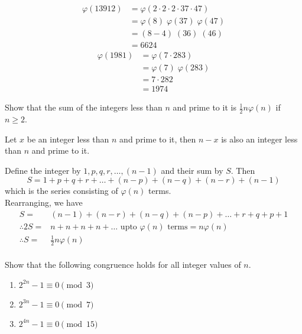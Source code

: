 \documentclass[12pt]{book}
\begin{document}
\begin{soln}
\begin{align*}
        \varphi(13912) & =\varphi(2\cdot 2\cdot2\cdot37\cdot47)                       \\
                       & =\varphi\left( 8\right)\;\varphi\left(37\right)\;\varphi(47) \\
                       & =\left( 8-4\right)\;\left(36\right)\;(46)                    \\
                       & =6624
    \end{align*}
    \begin{align*}
        \varphi(1981) & =\varphi(7\cdot 283)                             \\
                      & =\varphi\left( 7\right)\;\varphi\left(283\right) \\
                      & =7\cdot282                                       \\
                      & =1974
    \end{align*}
\end{soln}
\begin{qn}
    Show that the sum of the integers less than $ n $ and prime to it is $ \frac{1}{2}n \varphi(n) $ if $ n\geq 2 $.
\end{qn}
\begin{soln}
    Let $ x $ be an integer less than $ n $ and prime to it, then $ n-x $ is also an integer less than $ n $ and prime to it.

    Define the integer by $ 1,p,q,r,\dots,(n-1) $ and their sum by $ S $. Then
    \[S=1+p+q+r+\dots+(n-p)+(n-q)+(n-r)+(n-1)\]
    which is the series consisting of $ \varphi(n) $ terms.\\
    Rearranging, we have
    \begin{align*}
        S=             & (n-1)+(n-r)+(n-q)+(n-p)+\dots+r+q+p+1                            \\
        \therefore 2S= & n+n+n+n+\dots \text{ upto } \varphi(n)\text{ terms} =n\varphi(n) \\
        \therefore S=  & \frac{1}{2}n\varphi(n)                                           \\
    \end{align*}
\end{soln}
\begin{qn}
    Show that the following congruence holds for all integer values of $ n $.
    \begin{enumerate}[label=(\roman*)]
        \item $ 2^{2n}-1\equiv 0 \pmod{3} $
        \item $ 2^{3n}-1\equiv 0 \pmod{7} $
        \item $ 2^{4n}-1\equiv 0 \pmod{15} $
    \end{enumerate}
\end{qn}
\end{document}
